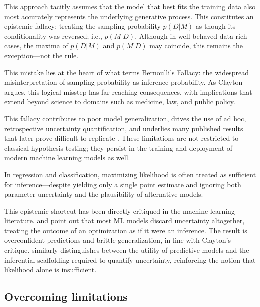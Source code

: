 \documentclass[preprint,authoryear]{elsarticle}
\begin{document}
This approach tacitly assumes that the model that best fits the training data also most accurately represents the underlying generative process. This constitutes an epistemic fallacy; treating the sampling probability $p(D|M)$ as though its conditionality was reversed; i.e., $p(M|D)$. Although in well-behaved data-rich cases, the maxima of $p(D|M)$ and $p(M|D)$ may coincide, this remains the exception—not the rule.

This mistake lies at the heart of what \cite{clayton2022bernoulli} terms Bernoulli's Fallacy: the widespread misinterpretation of sampling probability as inference probability. As Clayton argues, this logical misstep has far-reaching consequences, with implications that extend beyond science to domains such as medicine, law, and public policy.

This fallacy contributes to poor model generalization, drives the use of ad hoc, retrospective uncertainty quantification, and underlies many published results that later prove difficult to replicate \cite{baker2016, cobey2024biomedical}. These limitations are not restricted to classical hypothesis testing; they persist in the training and deployment of modern machine learning models as well.

In regression and classification, maximizing likelihood is often treated as sufficient for inference—despite yielding only a single point estimate and ignoring both parameter uncertainty and the plausibility of alternative models.

This epistemic shortcut has been directly critiqued in the machine learning literature. \cite{gal2016uncertainty} and \cite{ghahramani2015probabilistic} point out that most ML models discard uncertainty altogether, treating the outcome of an optimization as if it were an inference. The result is overconfident predictions and brittle generalization, in line with Clayton’s critique. \cite{bishop2006pattern} similarly distinguishes between the utility of predictive models and the inferential scaffolding required to quantify uncertainty, reinforcing the notion that likelihood alone is insufficient.


\subsection{Overcoming limitations} 
\end{document}
